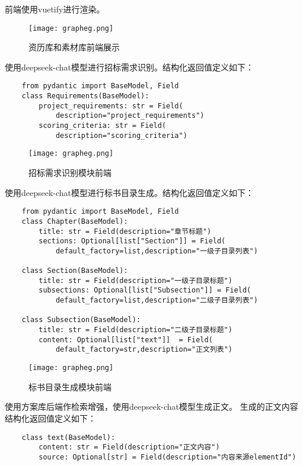 \documentclass{xmu}
\begin{document}
    前端使用vuetify进行渲染。
    \begin{figure}[!htb]
        \centering
        \texttt{[image: grapheg.png]}\\
        \caption{资历库和素材库前端展示
        }\label{}
    \end{figure}

    使用deepseek-chat模型进行招标需求识别。结构化返回值定义如下：
    \begin{verbatim}
    from pydantic import BaseModel, Field
    class Requirements(BaseModel):
        project_requirements: str = Field(
            description="project_requirements")
        scoring_criteria: str = Field(
            description="scoring_criteria")
    \end{verbatim}

    \begin{figure}[!htb]
        \centering
        \texttt{[image: grapheg.png]}\\
        \caption{招标需求识别模块前端
        }\label{}
    \end{figure}

    使用deepseek-chat模型进行标书目录生成。结构化返回值定义如下：
    \begin{verbatim}
    from pydantic import BaseModel, Field
    class Chapter(BaseModel):
        title: str = Field(description="章节标题")
        sections: Optional[list["Section"]] = Field(
            default_factory=list,description="一级子目录列表")
    
    class Section(BaseModel):
        title: str = Field(description="一级子目录标题")
        subsections: Optional[list["Subsection"]] = Field(
            default_factory=list,description="二级子目录列表")
        
    class Subsection(BaseModel):
        title: str = Field(description="二级子目录标题")
        content: Optional[list["text"]]  = Field(
            default_factory=str,description="正文列表")
    \end{verbatim}

    \begin{figure}[!htb]
        \centering
        \texttt{[image: grapheg.png]}\\
        \caption{标书目录生成模块前端
        }\label{}
    \end{figure}

    使用方案库后端作检索增强，使用deepseek-chat模型生成正文。
    生成的正文内容结构化返回值定义如下：
    \begin{verbatim}
    class text(BaseModel):
        content: str = Field(description="正文内容")
        source: Optional[str] = Field(description="内容来源elementId")
    \end{verbatim}
\end{document}
